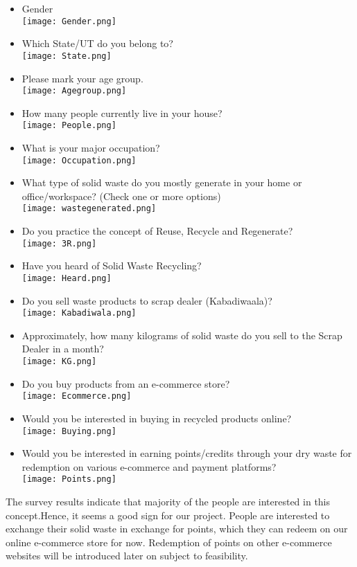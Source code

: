 \documentclass{article}
\begin{document}
\begin{itemize}
    \item Gender\\
    \texttt{[image: Gender.png]}
    \item Which State/UT do you belong to?\\
    \texttt{[image: State.png]}
    \item Please mark your age group.\\
    \texttt{[image: Agegroup.png]}
    \newpage
    \item How many people currently live in your house?\\
    \texttt{[image: People.png]}
    \item What is your major occupation?\\
    \texttt{[image: Occupation.png]}
    \item What type of solid waste do you mostly generate in your home or office/workspace? (Check one or more options)\\
    \texttt{[image: wastegenerated.png]}
    \item Do you practice the concept of Reuse, Recycle and Regenerate?\\
    \texttt{[image: 3R.png]}
    \item Have you heard of Solid Waste Recycling?\\
    \texttt{[image: Heard.png]}
    \item Do you sell waste products to scrap dealer (Kabadiwaala)?\\
    \texttt{[image: Kabadiwala.png]}
    \newpage
    \item Approximately, how many kilograms of solid waste do you sell to the Scrap Dealer in a month?\\
    \texttt{[image: KG.png]}
    \item Do you buy products from an e-commerce store?\\
    \texttt{[image: Ecommerce.png]}
    \item Would you be interested in buying in recycled products online?\\
    \texttt{[image: Buying.png]}
    \newpage
    \item Would you be interested in earning points/credits through your dry waste for redemption on various e-commerce and payment platforms?\\
    \texttt{[image: Points.png]}
\end{itemize}
\par The survey results indicate that majority of the people are interested in this concept.Hence, it seems a good sign for our project. People are interested to exchange their solid waste in exchange for points, which they can redeem on our online e-commerce store for now. Redemption of points on other e-commerce websites will be introduced later on subject to feasibility.
\end{document}

